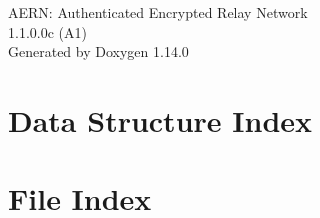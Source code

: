 \documentclass[twoside]{book}
\newcommand{\+}{\discretionary{\mbox{\scriptsize$\hookleftarrow$}}{}{}}
\newcommand{\clearemptydoublepage}{%
    \newpage{\pagestyle{empty}\cleardoublepage}%
  }
\begin{document}
  \raggedbottom
    \hypersetup{pageanchor=false,
                bookmarksnumbered=true,
                pdfencoding=unicode
               }
  \begin{titlepage}
  \vspace*{7cm}
  \begin{center}%
  {\Large AERN\+: Authenticated Encrypted Relay Network}\\
  [1ex]\large 1.\+1.\+0.\+0c (\+A1) \\
  \vspace*{1cm}
  {\large Generated by Doxygen 1.14.0}\\
  \end{center}
  \end{titlepage}
  \clearemptydoublepage
  \tableofcontents
  \clearemptydoublepage
  \hypersetup{pageanchor=true}


\chapter{Data Structure Index}

\chapter{File Index}

\end{document}

